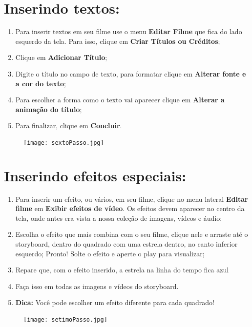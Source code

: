 \documentclass{article}
\begin{document}
{\section{Inserindo textos:}
\begin{enumerate}
\item Para inserir textos em seu filme use o menu \textbf{Editar Filme} que fica do lado esquerdo da tela. Para isso, clique em \textbf{Criar Títulos ou Créditos};
\item Clique em \textbf{Adicionar Título};
\item Digite o título no campo de texto, para formatar clique em \textbf{Alterar fonte e a cor do texto};
\item Para escolher a forma como o texto vai aparecer clique em \textbf{Alterar a animação do título};
\item Para finalizar, clique em \textbf{Concluir}.
\end{enumerate}

\begin{figure}[h!]
\centering
\texttt{[image: sextoPasso.jpg]}
\end{figure}

\newpage

\section{Inserindo efeitos especiais:}
\begin{enumerate}
\item Para inserir um efeito, ou vários, em seu filme, clique no menu lateral \textbf{Editar filme} em \textbf{Exibir efeitos de vídeo}. Os efeitos devem aparecer no centro da tela, onde antes era vista a nossa coleção de imagens, vídeos e áudio;
\item Escolha o efeito que mais combina com o seu filme, clique nele e arraste até o storyboard, dentro do quadrado com uma estrela dentro, no canto inferior
esquerdo; Pronto! Solte o efeito e aperte o play para visualizar;
\item Repare que, com o efeito inserido, a estrela na linha do tempo fica azul
\item Faça isso em todas as imagens e vídeos do storyboard. 
\item \textbf{Dica:} Você pode escolher um efeito diferente para cada quadrado!
\end{enumerate}

\begin{figure}[h!]
\centering
\texttt{[image: setimoPasso.jpg]}
\end{figure}

}
\end{document}
